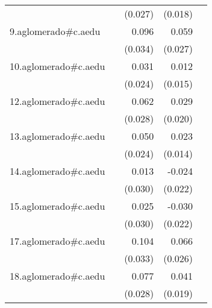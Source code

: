 {\begin{longtable}{l*{4}{D{.}{.}{-1}}}
            &                     &     (0.027)         &     (0.018)         &                     \\
\addlinespace
9.aglomerado#c.aedu&                     &       0.096\sym{**} &       0.059\sym{*}  &                     \\
            &                     &     (0.034)         &     (0.027)         &                     \\
\addlinespace
10.aglomerado#c.aedu&                     &       0.031         &       0.012         &                     \\
            &                     &     (0.024)         &     (0.015)         &                     \\
\addlinespace
12.aglomerado#c.aedu&                     &       0.062\sym{*}  &       0.029         &                     \\
            &                     &     (0.028)         &     (0.020)         &                     \\
\addlinespace
13.aglomerado#c.aedu&                     &       0.050\sym{*}  &       0.023         &                     \\
            &                     &     (0.024)         &     (0.014)         &                     \\
\addlinespace
14.aglomerado#c.aedu&                     &       0.013         &      -0.024         &                     \\
            &                     &     (0.030)         &     (0.022)         &                     \\
\addlinespace
15.aglomerado#c.aedu&                     &       0.025         &      -0.030         &                     \\
            &                     &     (0.030)         &     (0.022)         &                     \\
\addlinespace
17.aglomerado#c.aedu&                     &       0.104\sym{**} &       0.066\sym{*}  &                     \\
            &                     &     (0.033)         &     (0.026)         &                     \\
\addlinespace
18.aglomerado#c.aedu&                     &       0.077\sym{**} &       0.041\sym{*}  &                     \\
            &                     &     (0.028)         &     (0.019)         &                     \\

\end{longtable}}

